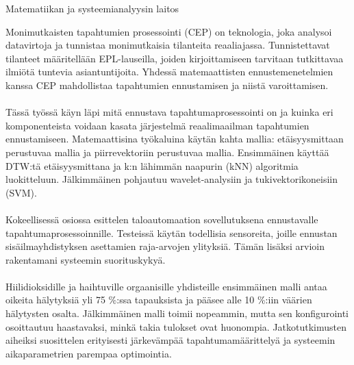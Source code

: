 \documentclass[english,12pt,a4paper,pdftex]{report}
\begin{document}
%
{Matematiikan ja systeemianalyysin laitos}


\author{Jussi Kolehmainen}


\date{08.08.2013}



\makecoverpage



\begin{abstractpage}[finnish]
Monimutkaisten tapahtumien prosessointi (CEP) on teknologia, joka analysoi datavirtoja ja tunnistaa monimutkaisia tilanteita reaaliajassa. Tunnistettavat tilanteet m\"a\"aritell\"a\"an EPL-lauseilla, joiden kirjoittamiseen tarvitaan tutkittavaa ilmi\"ot\"a tuntevia asiantuntijoita. Yhdess\"a matemaattisten ennustemenetelmien kanssa CEP mahdollistaa tapahtumien ennustamisen ja niist\"a varoittamisen.
\\ 
\\
T\"ass\"a ty\"oss\"a k\"ayn l\"api mit\"a ennustava tapahtumaprosessointi on ja kuinka eri komponenteista voidaan kasata j\"arjestelm\"a reaalimaailman tapahtumien ennustamiseen. Matemaattisina ty\"okaluina k\"ayt\"an kahta mallia: et\"aisyysmittaan perustuvaa mallia ja piirrevektoriin perustuvaa mallia. Ensimm\"ainen k\"aytt\"a\"a DTW:t\"a et\"aisyysmittana ja k:n l\"ahimm\"an naapurin (kNN) algoritmia luokitteluun. J\"alkimm\"ainen pohjautuu wavelet-analysiin ja tukivektorikoneisiin (SVM).
\\
\\
Kokeellisess\"a osiossa esittelen taloautomaation sovellutuksena ennustavalle tapahtumaprosessoinnille. Testeiss\"a k\"ayt\"an todellisia sensoreita, joille ennustan sis\"ailmayhdistyksen asettamien raja-arvojen ylityksi\"a. T\"am\"an lis\"aksi arvioin rakentamani systeemin suorituskyky\"a.
\\
\\
Hiilidioksidille ja haihtuville orgaanisille yhdisteille ensimm\"ainen malli antaa oikeita h\"alytyksi\"a yli 75 \%:ssa tapauksista ja p\"a\"asee alle 10 \%:iin v\"a\"arien h\"alytysten osalta. J\"alkimm\"ainen malli toimii nopeammin, mutta sen konfigurointi osoittautuu haastavaksi, mink\"a takia tulokset ovat huonompia. Jatkotutkimusten aiheiksi suosittelen erityisesti j\"arkev\"amp\"a\"a tapahtumam\"a\"arittely\"a ja systeemin aikaparametrien parempaa optimointia.
\end{abstractpage}
\end{document}
